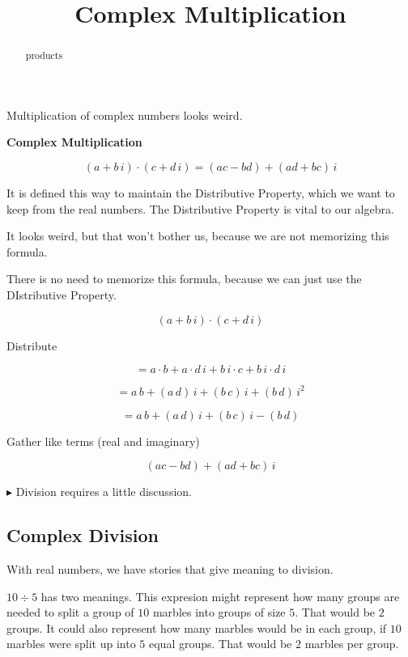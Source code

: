 \documentclass{ximera}
\title{Complex Multiplication}
\begin{document}
\begin{abstract}
products
\end{abstract}
\maketitle


Multiplication of complex numbers looks weird.





\begin{definition} \textbf{\textcolor{green!50!black}{Complex Multiplication}}


\[    (a + b \, i) \cdot (c + d \, i) = (ac-bd) + (ad+bc) \, i           \]

\end{definition}


It is defined this way to maintain the Distributive Property, which we want to keep from the real numbers.  The Distributive Property is vital to our algebra.

It looks weird, but that won't bother us, because we are not memorizing this formula.

There is no need to memorize this formula, because we can just use the DIstributive Property.



\[    (a + b \, i) \cdot (c + d \, i)   \]

Distribute 

\[     = a \cdot b + a \cdot d \, i + b \, i \cdot c + b \, i \cdot d \, i          \]

\[     = a \, b + (a \, d) \, i + (b \, c) \, i + (b \, d) \, i^2   \]

\[     = a \, b + (a \, d) \, i + (b \, c) \, i - (b \, d)    \]

Gather like terms (real and imaginary)

\[    (ac-bd) + (ad+bc) \, i           \]



$\blacktriangleright$ Division requires a little discussion.




\subsection*{Complex Division}


With real numbers, we have stories that give meaning to division.


$10 \div 5$ has two meanings.  This expresion might represent how many groups are needed to split a group of $10$ marbles into groups of size $5$.  That would be $2$ groups.  It could also represent how many marbles would be in each group, if $10$ marbles were split up into $5$ equal groups.  That would be $2$ marbles per group.
\end{document}
